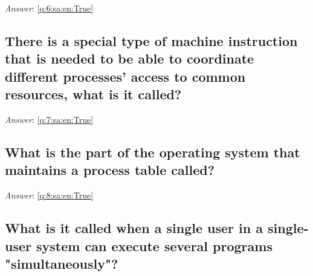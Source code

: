 \documentclass[a4paper,11pt,oneside]{article}
\begin{document}
\begin{sloppypar}
\vspace{2cm}

\noindent\makebox[\textwidth]{\hrulefill}

\vspace{1cm}

\textit{Answer}: \autoref{q:6:sa:en:True}



\subsection{There is a special type of machine instruction that is needed to be able to coordinate different processes' access to common resources, what is it called?}

\label{q:7:sa:en:False}

\vspace{2cm}

\noindent\makebox[\textwidth]{\hrulefill}

\vspace{1cm}

\textit{Answer}: \autoref{q:7:sa:en:True}



\subsection{What is the part of the operating system that maintains a process table called?}

\label{q:8:sa:en:False}

\vspace{2cm}

\noindent\makebox[\textwidth]{\hrulefill}

\vspace{1cm}

\textit{Answer}: \autoref{q:8:sa:en:True}



\subsection{What is it called when a single user in a single-user system can execute several programs "simultaneously"?}

\label{q:10:sa:en:False}

\vspace{2cm}

\noindent\makebox[\textwidth]{\hrulefill}

\vspace{1cm}


\end{sloppypar}
\end{document}
